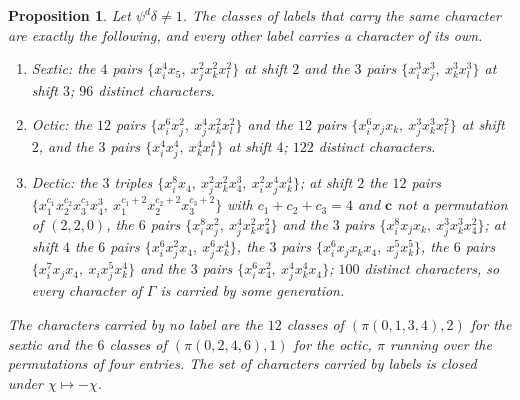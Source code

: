 \documentclass[11pt]{amsart}
\newtheorem{proposition}[theorem]{Proposition}
\theoremstyle{definition}
\theoremstyle{remark}
\newcommand{\cc}{\mathbf{c}}
\begin{document}
\begin{proposition}\label{prop:wchars}
Let $\psi^d\delta\ne1$. The classes of labels that carry the same character
are exactly the following, and every other label carries a character of its
own.
\begin{enumerate}[label=\textup{(\alph*)},leftmargin=*,itemsep=1pt]
\item Sextic: the $4$ pairs $\{x_i^4x_5,\ x_j^2x_k^2x_l^2\}$ at shift
$2$ and the $3$ pairs $\{x_i^3x_j^3,\ x_k^3x_l^3\}$ at shift $3$; $96$
distinct characters.
\item Octic: the $12$ pairs $\{x_i^6x_j^2,\ x_j^4x_k^2x_l^2\}$ and the $12$
pairs $\{x_i^6x_jx_k,\ x_j^3x_k^3x_l^2\}$ at shift $2$, and the $3$ pairs
$\{x_i^4x_j^4,\ x_k^4x_l^4\}$ at shift $4$; $122$ distinct characters.
\item Dectic: the $3$ triples $\{x_i^8x_4,\ x_j^2x_k^2x_4^3,\
x_i^2x_j^4x_k^4\}$; at shift $2$ the $12$ pairs $\{x_1^{c_1}x_2^{c_2}
x_3^{c_3}x_4^3,\ x_1^{c_1+2}x_2^{c_2+2}x_3^{c_3+2}\}$ with $c_1+c_2+c_3=4$
and $\cc$ not a permutation of $(2,2,0)$, the $6$ pairs
$\{x_i^8x_j^2,\ x_j^4x_k^2x_4^2\}$ and the $3$ pairs
$\{x_i^8x_jx_k,\ x_j^3x_k^3x_4^2\}$; at shift $4$ the $6$ pairs
$\{x_i^6x_j^2x_4,\ x_j^6x_k^4\}$, the $3$ pairs
$\{x_i^6x_jx_kx_4,\ x_j^5x_k^5\}$, the $6$ pairs
$\{x_i^7x_jx_4,\ x_ix_j^5x_k^4\}$ and the $3$ pairs
$\{x_i^6x_4^2,\ x_j^4x_k^4x_4\}$; $100$ distinct characters, so every
character of $\Gamma$ is carried by some generation.
\end{enumerate}
The characters carried by no label are the $12$ classes of
$(\pi(0,1,3,4),2)$ for the sextic and the $6$ classes of
$(\pi(0,2,4,6),1)$ for the octic, $\pi$ running over the permutations of
four entries. The set of characters carried by labels is closed under
$\chi\mapsto-\chi$.
\end{proposition}
\end{document}
